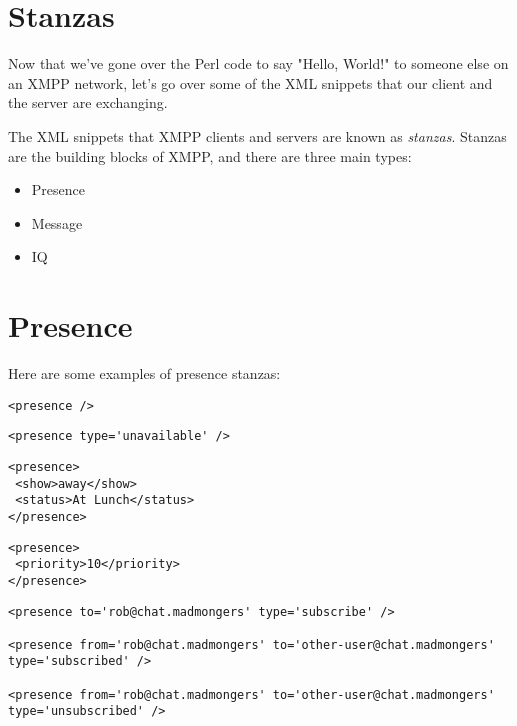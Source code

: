 \section{Stanzas}

Now that we've gone over the Perl code to say "Hello, World!" to someone else on an XMPP
network, let's go over some of the XML snippets that our client and the server are exchanging.
\pause

The XML snippets that XMPP clients and servers are known as \textit{stanzas}.  Stanzas are the
building blocks of XMPP, and there are three main types:
\pause

\begin{itemize}
\item Presence
\pause
\item Message
\pause
\item IQ
\end{itemize}

\newpage
\section{Presence}

\pause
Here are some examples of presence stanzas:

\begin{shaded}
\begin{verbatim}
<presence />
\end{verbatim}
\end{shaded}

\pause
\begin{shaded}
\begin{verbatim}
<presence type='unavailable' />
\end{verbatim}
\end{shaded}

\pause
\begin{shaded}
\begin{verbatim}
<presence>
 <show>away</show>
 <status>At Lunch</status>
</presence>
\end{verbatim}
\end{shaded}

\pause
\begin{shaded}
\begin{verbatim}
<presence>
 <priority>10</priority>
</presence>
\end{verbatim}
\end{shaded}

\pause
\begin{shaded}
\begin{verbatim}
<presence to='rob@chat.madmongers' type='subscribe' />

<presence from='rob@chat.madmongers' to='other-user@chat.madmongers' type='subscribed' />

<presence from='rob@chat.madmongers' to='other-user@chat.madmongers' type='unsubscribed' />
\end{verbatim}
\end{shaded}

